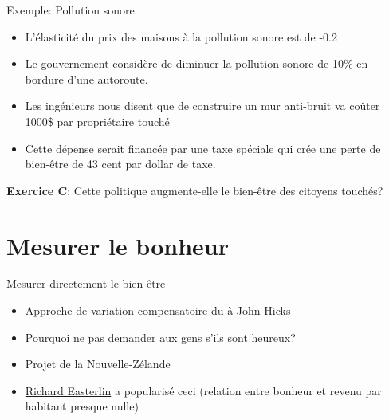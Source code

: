 \documentclass[handout]{beamer}
\begin{document}
\begin{frame}{Exemple: Pollution sonore}

\begin{itemize}
	\item L'élasticité du prix des maisons à la pollution sonore est de -0.2
	\item Le gouvernement considère de diminuer la pollution sonore de 10\% en bordure d'une autoroute. 
	\item Les ingénieurs nous disent que de construire un mur anti-bruit va coûter 1000\$ par propriétaire touché
	\item Cette dépense serait financée par une taxe spéciale qui crée une perte de bien-être de 43 cent par dollar de taxe. 
\end{itemize}
	
\textbf{Exercice C}: Cette politique augmente-elle le bien-être des citoyens touchés?
\end{frame}

\section{Mesurer le bonheur}

\begin{frame}{Mesurer directement le bien-être}

\begin{itemize}
\item Approche de variation compensatoire du à \href{https://fr.wikipedia.org/wiki/John_Hicks}{John Hicks}
\item Pourquoi ne pas demander aux gens s'ils sont heureux?
\item Projet de la Nouvelle-Zélande
\item \href{https://fr.wikipedia.org/wiki/Richard_Easterlin}{Richard Easterlin} a popularisé ceci (relation entre bonheur et revenu par habitant presque nulle)
\end{itemize}


\end{frame}
\end{document}
